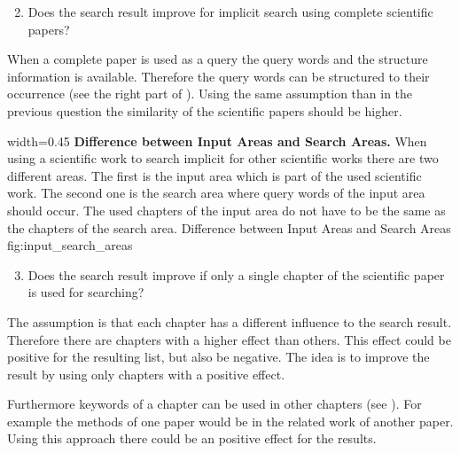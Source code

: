 \begin{enumerate}
  \setcounter{enumi}{1}
  \item Does the search result improve for implicit search using complete scientific papers?
\end{enumerate}

When a complete paper is used as a query the query words and the structure information is available. Therefore the query words can be structured to their occurrence (see the right part of ). Using the same assumption than in the previous question the similarity of the scientific papers should be higher.

      {width=0.45\textwidth}
      {\textbf{Difference between Input Areas and Search Areas.} When using a scientific work to search implicit for other scientific works there are two different areas. The first is the input area which is part of the used scientific work. The second one is the search area where query words of the input area should occur. The used chapters of the input area do not have to be the same as the chapters of the search area.}
      {Difference between Input Areas and Search Areas}
      {fig:input_search_areas}

\begin{enumerate}
  \setcounter{enumi}{2}
  \item Does the search result improve if only a single chapter of the scientific paper is used for searching?
\end{enumerate}

The assumption is that each chapter has a different influence to the search result. Therefore there are chapters with a higher effect than others. This effect could be positive for the resulting list, but also be negative. The idea is to improve the result by using only chapters with a positive effect.

Furthermore keywords of a chapter can be used in other chapters (see ). For example the methods of one paper would be in the related work of another paper. Using this approach there could be an positive effect for the results.
